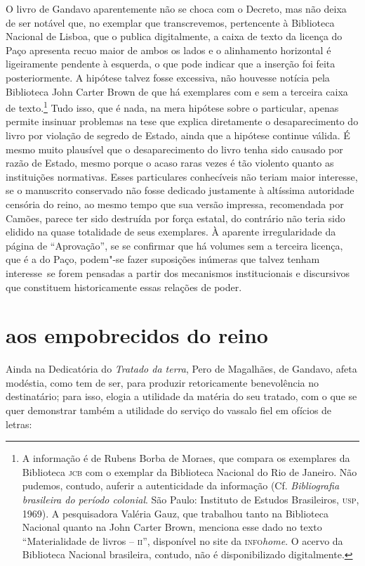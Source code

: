 O livro de Gandavo aparentemente não se choca com o Decreto, mas não
deixa de ser notável que, no exemplar que transcrevemos, pertencente à
Biblioteca Nacional de Lisboa, que o publica digitalmente, a caixa de
texto da licença do Paço apresenta recuo maior de ambos os lados e o
alinhamento horizontal é ligeiramente pendente à esquerda, o que pode
indicar que a inserção foi feita posteriormente. A hipótese talvez
fosse excessiva, não houvesse notícia pela Biblioteca John Carter Brown
de que há exemplares com e sem a terceira caixa de texto.\footnote{ A
informação é de Rubens Borba de Moraes, que compara os exemplares da
Biblioteca \textsc{jcb} com o exemplar da Biblioteca Nacional do Rio de Janeiro.
Não pudemos, contudo, auferir a autenticidade da informação (Cf.
\textit{Bibliografia brasileira do período colonial}. São Paulo: Instituto de
Estudos Brasileiros, \textsc{usp}, 1969). A pesquisadora Valéria Gauz, que
trabalhou tanto na Biblioteca Nacional quanto na John Carter Brown,
menciona esse dado no texto ``Materialidade de livros -- \textsc{ii}'', disponível no site da \textsc{info}\textit{home}. 
O acervo da Biblioteca Nacional brasileira, contudo, não é
disponibilizado digitalmente.} Tudo isso, que é nada, na mera hipótese
sobre o particular, apenas permite insinuar problemas na tese que
explica diretamente o desaparecimento do livro por violação de segredo
de Estado, ainda que a hipótese continue válida. É mesmo muito
plausível que o desaparecimento do livro tenha sido causado por razão
de Estado, mesmo porque o acaso raras vezes é tão violento quanto as
instituições normativas. Esses particulares conhecíveis não teriam
maior interesse, se o manuscrito conservado não fosse dedicado
justamente à altíssima autoridade censória do reino, ao mesmo tempo que
sua versão impressa, recomendada por Camões, parece ter sido destruída
por força estatal, do contrário não teria sido elidido na quase
totalidade de seus exemplares. À aparente irregularidade da página de
``Aprovação'', se se confirmar que há volumes
sem a terceira licença, que é a do Paço, podem"-se fazer suposições
inúmeras que talvez tenham \mbox{interesse se} forem pensadas a partir dos
mecanismos institucionais e discursivos que constituem historicamente
essas relações de poder.

\section{aos empobrecidos do reino}

Ainda na Dedicatória do \textit{Tratado da terra}, Pero de Magalhães, de
Gandavo, afeta modéstia, como tem de ser, para produzir retoricamente
benevolência no destinatário; para isso, elogia a utilidade da matéria
do seu tratado, com o que se quer demonstrar também a utilidade do
serviço do vassalo fiel em ofícios de letras:

